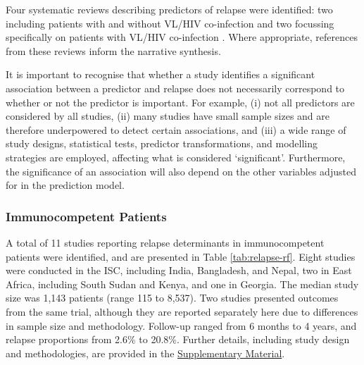 Four systematic reviews describing predictors of relapse were identified: two including patients with and without VL/HIV co-infection\cite{hirve2016, santos2023} and two focussing specifically on patients with VL/HIV co-infection \cite{cota2011,alemayehu2016}. Where appropriate, references from these reviews inform the narrative synthesis.

It is important to recognise that whether a study identifies a significant association between a predictor and relapse does not necessarily correspond to whether or not the predictor is important. For example, (i) not all predictors are considered by all studies, (ii) many studies have small sample sizes and are therefore underpowered to detect certain associations, and (iii) a wide range of study designs, statistical tests, predictor transformations, and modelling strategies are employed, affecting what is considered `significant'. Furthermore, the significance of an association will also depend on the other variables adjusted for in the prediction model.

\subsubsection{Immunocompetent Patients}

A total of 11 studies reporting relapse determinants in immunocompetent patients were identified, and are presented in Table \ref{tab:relapse-rf}. Eight studies were conducted in the ISC, including India\cite{burza2014, goyal2019, goyal2020, ostyn2014, sundar2019}, Bangladesh\cite{lucero2015,mondal2019rx}, and Nepal\cite{rijal2013}, two in East Africa, including South Sudan\cite{gorski2010} and Kenya\cite{kennedy2024}, and one in Georgia\cite{kajaia2011}. The median study size was 1,143 patients (range 115\cite{rijal2013} to 8,537\cite{burza2014}). Two studies presented outcomes from the same trial\cite{goyal2019, goyal2020}, although they are reported separately here due to differences in sample size and methodology. Follow-up ranged from 6 months to 4 years, and relapse proportions from 2.6\%\cite{lucero2015} to 20.8\%\cite{rijal2013}. Further details, including study design and methodologies, are provided in the \href{https://github.com/jpwil/dphil}{Supplementary Material}.

